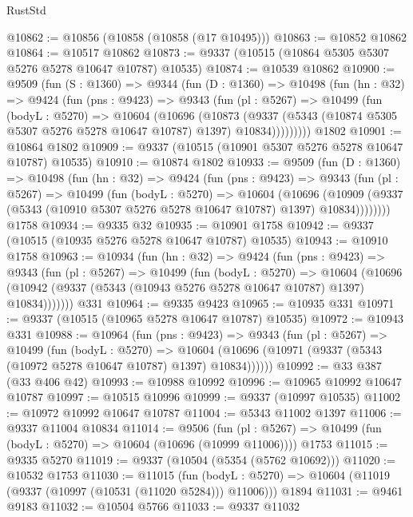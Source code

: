 \begin{lexlean}{RustStd}
\begin{coremodule}
@10862 := @10856 (@10858 (@10858 (@17 @10495)))
@10863 := @10852 @10862
@10864 := @10517 @10862
@10873 := @9337 (@10515 (@10864 @5305 @5307 @5276 @5278 @10647 @10787) @10535)
@10874 := @10539 @10862
@10900 := @9509
    (fun (S : @1360) =>
    @9344
      (fun (D : @1360) =>
      @10498
        (fun (hn : @32) =>
        @9424
          (fun (pns : @9423) =>
          @9343
            (fun (pl : @5267) =>
            @10499
              (fun (bodyL : @5270) =>
              @10604
                (@10696
                  (@10873
                    (@9337
                      (@5343 (@10874 @5305 @5307 @5276 @5278 @10647 @10787) @1397)
                      @10834)))))))))
    @1802
@10901 := @10864 @1802
@10909 := @9337 (@10515 (@10901 @5307 @5276 @5278 @10647 @10787) @10535)
@10910 := @10874 @1802
@10933 := @9509
    (fun (D : @1360) =>
    @10498
      (fun (hn : @32) =>
      @9424
        (fun (pns : @9423) =>
        @9343
          (fun (pl : @5267) =>
          @10499
            (fun (bodyL : @5270) =>
            @10604
              (@10696
                (@10909 (@9337 (@5343 (@10910 @5307 @5276 @5278 @10647 @10787) @1397) @10834))))))))
    @1758
@10934 := @9335 @32
@10935 := @10901 @1758
@10942 := @9337 (@10515 (@10935 @5276 @5278 @10647 @10787) @10535)
@10943 := @10910 @1758
@10963 := @10934
    (fun (hn : @32) =>
    @9424
      (fun (pns : @9423) =>
      @9343
        (fun (pl : @5267) =>
        @10499
          (fun (bodyL : @5270) =>
          @10604
            (@10696 (@10942 (@9337 (@5343 (@10943 @5276 @5278 @10647 @10787) @1397) @10834)))))))
    @331
@10964 := @9335 @9423
@10965 := @10935 @331
@10971 := @9337 (@10515 (@10965 @5278 @10647 @10787) @10535)
@10972 := @10943 @331
@10988 := @10964
    (fun (pns : @9423) =>
    @9343
      (fun (pl : @5267) =>
      @10499
        (fun (bodyL : @5270) =>
        @10604 (@10696 (@10971 (@9337 (@5343 (@10972 @5278 @10647 @10787) @1397) @10834))))))
@10992 := @33 @387 (@33 @406 @42)
@10993 := @10988 @10992
@10996 := @10965 @10992 @10647 @10787
@10997 := @10515 @10996
@10999 := @9337 (@10997 @10535)
@11002 := @10972 @10992 @10647 @10787
@11004 := @5343 @11002 @1397
@11006 := @9337 @11004 @10834
@11014 := @9506
    (fun (pl : @5267) => @10499 (fun (bodyL : @5270) => @10604 (@10696 (@10999 @11006))))
    @1753
@11015 := @9335 @5270
@11019 := @9337 (@10504 (@5354 (@5762 @10692)))
@11020 := @10532 @1753
@11030 := @11015
    (fun (bodyL : @5270) => @10604 (@11019 (@9337 (@10997 (@10531 (@11020 @5284))) @11006)))
    @1894
@11031 := @9461 @9183
@11032 := @10504 @5766
@11033 := @9337 @11032

\end{coremodule}
\end{lexlean}
